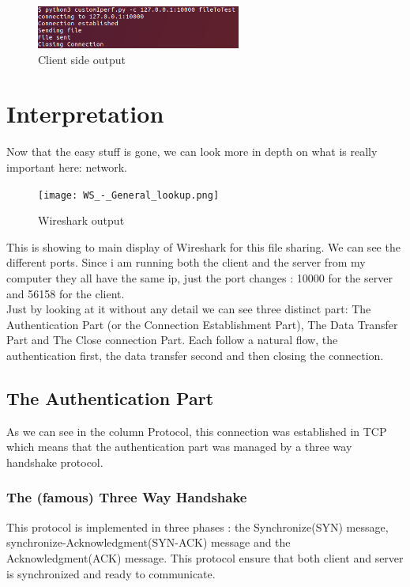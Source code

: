 \documentclass[a4paper]{article}
\begin{document}
\begin{figure}[H]
\centering
\includegraphics[width=0.6\textwidth]{clientSide.png}
\caption{Client side output}
\end{figure}

\newpage
\section{Interpretation}

Now that the easy stuff is gone, we can look more in depth on what is really important here: network.

\begin{figure}[H]
\centering
\texttt{[image: WS\_-\_General\_lookup.png]}
\caption{Wireshark output}
\end{figure}

This is showing to main display of Wireshark for this file sharing.
We can see the different ports.
Since i am running both the client and the server from my computer they all have the same ip, just the port changes : 10000 for the server and 56158 for the client.\\
Just by looking at it without any detail we can see three distinct part: The Authentication Part (or the Connection Establishment Part), The Data Transfer Part and The Close connection Part. Each follow a natural flow, the authentication first, the data transfer second and then closing the connection. 

\subsection{The Authentication Part}

As we can see in the column Protocol, this connection was established in TCP which means that the authentication part was managed by a three way handshake protocol.

\subsubsection{The (famous) Three Way Handshake}

This protocol is implemented in three phases : the Synchronize(SYN) message, synchronize-Acknowledgment(SYN-ACK) message and the Acknowledgment(ACK) message. This protocol ensure that both client and server is synchronized and ready to communicate.
\end{document}
